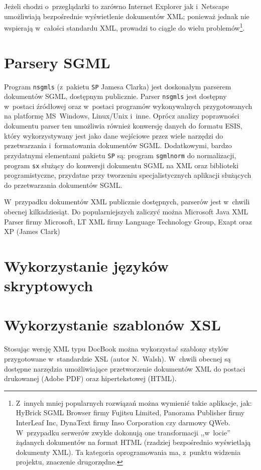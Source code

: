 \documentclass[brudnopis]{xmgr}
\begin{document}
Jeżeli chodzi o~przeglądarki to zarówno Internet Explorer jak
i~Netscape umożliwiają bezpośrednie wyświetlenie dokumentów XML;
ponieważ jednak nie wspierają w~całości standardu XML, prowadzi to
ciągle do wielu problemów\footnote{Z~innych mniej popularnych
  rozwiązań można wymienić takie aplikacje, jak: HyBrick SGML
  Browser firmy Fujitsu Limited, Panorama Publisher firmy InterLeaf
  Inc, DynaText firmy Inso Corporation czy darmowy QWeb. W~przypadku
  serwerów zwykle dokonują one transformacji ,,w~locie'' żądanych
  dokumentów na format HTML (rzadziej bezpośrednio wyświetlają
  dokumenty XML).  Ta kategoria oprogramowania ma, z~punktu widzenia
  projektu, znaczenie drugorzędne.}.

\section{Parsery SGML}
Program \texttt{nsgmls} (z~pakietu \texttt{SP} Jamesa Clarka) jest
doskonałym parserem dokumentów SGML, dostępnym
publicznie.  Parser \texttt{nsgmls} jest dostępny w~postaci źródłowej
oraz w~postaci programów wykonywalnych przygotowanych na platformę
MS~Windows, Linux/Unix i~inne. Oprócz analizy poprawności dokumentu
parser ten umożliwia również konwersję danych do formatu
ESIS, który wykorzystywany jest jako dane wejściowe przez
wiele narzędzi do przetwarzania i~formatowania dokumentów SGML.
Dodatkowymi, bardzo przydatnymi elementami pakietu \texttt{SP} są:
program \texttt{sgmlnorm} do normalizacji, program \texttt{sx} służący
do konwersji dokumentu SGML na XML oraz biblioteki programistyczne,
przydatne przy tworzeniu specjalistycznych aplikacji służących do
przetwarzania dokumentów SGML.

W~przypadku dokumentów XML publicznie dostępnych, parserów jest
w~chwili obecnej kilkadziesiąt. Do popularniejszych zaliczyć można
Microsoft Java XML Parser firmy Microsoft, LT XML firmy Language
Technology Group, Exapt oraz XP (James Clark)

\section{Wykorzystanie języków skryptowych}

\section{Wykorzystanie szablonów XSL}

Stosując wersję XML typu DocBook można wykorzystać szablony stylów
przygotowane w~standardzie XSL (autor N.~Walsh). W~chwili obecnej
są dostępne narzędzia umożliwiające przetworzenie dokumentów XML do
postaci drukowanej (Adobe PDF) oraz hipertekstowej (HTML).
\end{document}
